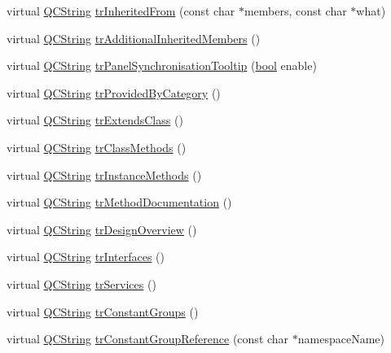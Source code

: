 \begin{DoxyCompactItemize}
\item 
virtual \hyperlink{class_q_c_string}{Q\+C\+String} \hyperlink{class_translator_japanese_a3204ade1900029b4523906972c629b48}{tr\+Inherited\+From} (const char $\ast$members, const char $\ast$what)
\item 
virtual \hyperlink{class_q_c_string}{Q\+C\+String} \hyperlink{class_translator_japanese_a13b991d50c189d057a8fdb99763b8f98}{tr\+Additional\+Inherited\+Members} ()
\item 
virtual \hyperlink{class_q_c_string}{Q\+C\+String} \hyperlink{class_translator_japanese_a26c13eefdf17423eb2f7a04eb7416894}{tr\+Panel\+Synchronisation\+Tooltip} (\hyperlink{qglobal_8h_a1062901a7428fdd9c7f180f5e01ea056}{bool} enable)
\item 
virtual \hyperlink{class_q_c_string}{Q\+C\+String} \hyperlink{class_translator_japanese_af2c9ab0ae3d70a4d00410f86665847b0}{tr\+Provided\+By\+Category} ()
\item 
virtual \hyperlink{class_q_c_string}{Q\+C\+String} \hyperlink{class_translator_japanese_a95ed5aea5be1a95219829cf0bd920b5a}{tr\+Extends\+Class} ()
\item 
virtual \hyperlink{class_q_c_string}{Q\+C\+String} \hyperlink{class_translator_japanese_a0790c233fafbc9884b5061fd3298a153}{tr\+Class\+Methods} ()
\item 
virtual \hyperlink{class_q_c_string}{Q\+C\+String} \hyperlink{class_translator_japanese_a59790428299178e856eedbfab9117ebc}{tr\+Instance\+Methods} ()
\item 
virtual \hyperlink{class_q_c_string}{Q\+C\+String} \hyperlink{class_translator_japanese_aedb0e792f5d6b3b9a50794f1982263ff}{tr\+Method\+Documentation} ()
\item 
virtual \hyperlink{class_q_c_string}{Q\+C\+String} \hyperlink{class_translator_japanese_a87b3e18a60443505018343b719f61679}{tr\+Design\+Overview} ()
\item 
virtual \hyperlink{class_q_c_string}{Q\+C\+String} \hyperlink{class_translator_japanese_ab202913125e78765f22b022c382e1c75}{tr\+Interfaces} ()
\item 
virtual \hyperlink{class_q_c_string}{Q\+C\+String} \hyperlink{class_translator_japanese_a47f643d05a0af26f61d5fbd420f3a464}{tr\+Services} ()
\item 
virtual \hyperlink{class_q_c_string}{Q\+C\+String} \hyperlink{class_translator_japanese_a012b03719809e57b67b162f97337ba70}{tr\+Constant\+Groups} ()
\item 
virtual \hyperlink{class_q_c_string}{Q\+C\+String} \hyperlink{class_translator_japanese_ad998de92c4a5b3e261ba6cdf0e27e8a0}{tr\+Constant\+Group\+Reference} (const char $\ast$namespace\+Name)

\end{DoxyCompactItemize}
